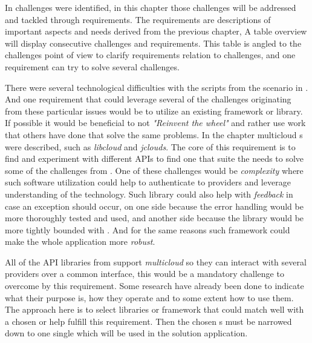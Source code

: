 
In  challenges were identified, in this chapter those challenges
will be addressed and tackled through requirements.
The requirements are descriptions of important aspects and needs derived from the previous chapter, 
A table overview will display consecutive challenges and requirements. 
This table is angled to the challenges point of view to clarify requirements relation to challenges,
and one requirement can try to solve several challenges.

There were several technological difficulties with the scripts from the scenario in 
.
And one requirement that could leverage several of the challenges
originating from these particular issues would be to utilize an existing framework or library.
If possible it would be beneficial to not \emph{"Reinvent the wheel"} and rather use work
that others have done that solve the same problems.
In the chapter  multicloud s 
were described, such as \emph{libcloud} and \emph{jclouds}.
The core of this requirement is to find and experiment with different APIs to find one
that suite the needs to solve some of the challenges from .
One of these challenges would be \emph{complexity} where such software utilization
could help to authenticate to providers and leverage understanding of the technology.
Such library could also help with \emph{feedback} in case an exception should occur, on one
side because the error handling would be more thoroughly tested and used,
and another side because the library would be more tightly bounded with .
And for the same reasons such framework could make the whole application more \emph{robust}.

All of the API libraries from  support \emph{multicloud} so they can
interact with several providers over a common interface, this would be a mandatory challenge
to overcome by this requirement.
Some research have already been done to indicate what their purpose is, 
how they operate and to some extent how to use them.
The approach here is to select libraries or framework that could match well with a chosen
 or help fulfill this requirement.
Then the chosen s must be narrowed down to one single  which will be
used in the solution application.

